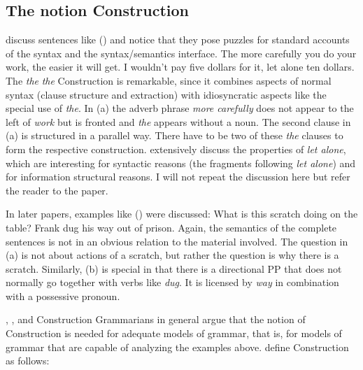 \documentclass[output=paper
	        ,collection
	        ,collectionchapter
 	        ,biblatex
                ,babelshorthands
                ,newtxmath
                ,draftmode
                ,colorlinks, citecolor=brown
]{langscibook}
\begin{document}
\subsection{The notion Construction}
\label{sec-def-construction}

\citet*{FKoC88a} discuss sentences like () and notice that they pose puzzles for standard
accounts of the syntax and the syntax/semantics interface. 
\eal
\ex The more carefully you do your work, the easier it will get.
\ex I wouldn't pay five dollars for it, let alone ten dollars.
\zl
The \emph{the}  \emph{the}  Construction is remarkable, since it combines aspects of normal syntax
(clause structure and extraction) with idiosyncratic aspects like the special use of
\emph{the}. In (a) the adverb phrase \emph{more carefully} does not appear to the left of
\emph{work} but is fronted and \emph{the} appears without a noun. The second clause in (a) is structured
in a parallel way. There have to be two of these \emph{the} clauses to form the respective
construction. \citet*{FKoC88a} extensively discuss the properties of \emph{let alone}, which are
interesting for syntactic reasons (the fragments following \emph{let alone}) and for information
structural reasons. I will not repeat the discussion here but refer the reader to the paper.

In later papers, examples like () were discussed:
\eal
\ex What is this scratch doing on the table? \hfill\citep[]{KF99a}
\ex Frank dug his way out of prison. \hfill\citep[]{Goldberg95a}
\zl
Again, the semantics of the complete sentences is not in an obvious relation to the material
involved. The question in (a) is not about actions of a scratch, but rather the question is why
there is a scratch. Similarly, (b) is special in that there is a directional PP that does not
normally go together with verbs like \emph{dug}. It is licensed by \emph{way} in combination with a
possessive pronoun.

\citet{FKoC88a}, \citet{Goldberg95a}, \citet{KF99a} and Construction Grammarians in general argue
that the notion of Construction is needed for adequate models of grammar, that is, for models of
grammar that are capable of analyzing the examples above. \citet[]{FKoC88a} define
Construction as follows: 
\end{document}
